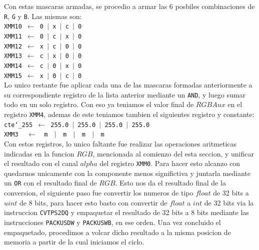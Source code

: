 Con estas mascaras armadas, se procedio a armar las 6 posbiles combinaciones de \texttt{R}, \texttt{G} y \texttt{B}. Las mismas son:\\

\noindent
\texttt{XMM10 $\gets$ 0 $\vert$ x $\vert$ c $\vert$ 0}\\
\texttt{XMM11 $\gets$ 0 $\vert$ c $\vert$ x $\vert$ 0}\\
\texttt{XMM12 $\gets$ x $\vert$ c $\vert$ 0 $\vert$ 0}\\
\texttt{XMM13 $\gets$ c $\vert$ x $\vert$ 0 $\vert$ 0}\\
\texttt{XMM14 $\gets$ c $\vert$ 0 $\vert$ x $\vert$ 0}\\
\texttt{XMM15 $\gets$ x $\vert$ 0 $\vert$ c $\vert$ 0}\\

Lo unico restante fue aplicar cada una de las mascaras formadas anteriormente a su correspondiente registro de la lista anterior mediante un \texttt{AND}, y luego sumar todo en un solo registro. Con eso ya teniamos el valor final de $RGBAux$ en el registro \texttt{XMM4}, ademas de este teniamos tambien el siguientes registro y constante:\\

\noindent
\texttt{cte\char`_255 $\gets$ 255.0 $\vert$ 255.0 $\vert$ 255.0 $\vert$ 255.0}\\
\texttt{XMM3 $\ \ \ \gets\ \ $ m $\ \ \vert\ \ $ m $\ \ \vert\ \ $ m $\ \ \vert\ \ $ m}\\

Con estos registros, lo unico faltante fue realizar las operaciones aritmeticas indicadas en la funcion $RGB$, mencionada al comienzo del esta seccion, y unificar el resultado con el canal $alpha$ del registro \texttt{XMM0}. Para hacer esto alcanzo con quedarnos unicamente con la componente menos significtiva y juntarla mediante un \texttt{OR} con el resultado final de $RGB$. Esto nos da el resultado final de la conversion, el siguiente paso fue convertir los numeros de tipo $float$ de 32 bits a $uint$ de 8 bits, para hacer esto basto con convertir de $float$ a $int$ de 32 bits via la instruccion \texttt{CVTPS2DQ} y empaquetar el resultado de 32 bits a 8 bits mediante las instrucciones \texttt{PACKUSDW} y \texttt{PACKUSWB}, en ese orden. Una vez concluido el empaquetado, procedimos a volcar dicho resultado a la misma posicion de memoria a partir de la cual iniciamos el ciclo.